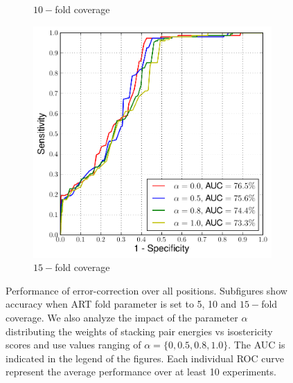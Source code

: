 \begin{figure}
\begin{subfigure}{.33\textwidth}
    \caption{$10-$fold coverage}
\end{subfigure}
\begin{subfigure}{.33\textwidth}
  \centering
  \includegraphics[width=\linewidth]{figures/15fold-a}
    \caption{$15-$fold coverage}
\end{subfigure}
\caption{Performance of error-correction over all positions. Subfigures show accuracy when
ART fold parameter is set to 5, 10 and $15-$fold coverage. We also analyze the impact of the parameter $\alpha$ distributing the weights of stacking pair energies vs isostericity scores and use values ranging of $\alpha = \{0, 0.5, 0.8, 1.0\}$. The AUC is indicated in the legend of the figures. Each individual ROC curve represent the average performance over at least 10 experiments.}

\label{fig:16s_all}
\end{figure}

